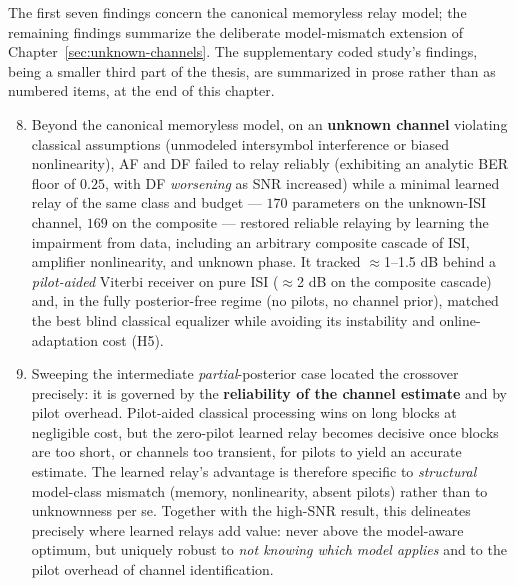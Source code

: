     The first seven findings concern the canonical memoryless relay model; the remaining findings summarize the deliberate model-mismatch extension of Chapter~\ref{sec:unknown-channels}. The supplementary coded study's findings, being a smaller third part of the thesis, are summarized in prose rather than as numbered items, at the end of this chapter.
\begin{enumerate}
\setcounter{enumi}{7}
    \item Beyond the canonical memoryless model, on an \textbf{unknown channel} violating classical assumptions (unmodeled intersymbol interference or biased nonlinearity), AF and DF failed to relay reliably (exhibiting an analytic BER floor of $0.25$, with DF \emph{worsening} as SNR increased) while a minimal learned relay of the same class and budget --- $170$ parameters on the unknown-ISI channel, $169$ on the composite --- restored reliable relaying by learning the impairment from data, including an arbitrary composite cascade of ISI, amplifier nonlinearity, and unknown phase. It tracked $\approx$1--1.5 dB behind a \emph{pilot-aided} Viterbi receiver on pure ISI ($\approx$2 dB on the composite cascade) and, in the fully posterior-free regime (no pilots, no channel prior), matched the best blind classical equalizer while avoiding its instability and online-adaptation cost (H5).

    \item Sweeping the intermediate \emph{partial}-posterior case located the crossover precisely: it is governed by the \textbf{reliability of the channel estimate} and by pilot overhead. Pilot-aided classical processing wins on long blocks at negligible cost, but the zero-pilot learned relay becomes decisive once blocks are too short, or channels too transient, for pilots to yield an accurate estimate. The learned relay's advantage is therefore specific to \emph{structural} model-class mismatch (memory, nonlinearity, absent pilots) rather than to unknownness per se. Together with the high-SNR result, this delineates precisely where learned relays add value: never above the model-aware optimum, but uniquely robust to \emph{not knowing which model applies} and to the pilot overhead of channel identification.


\end{enumerate}
